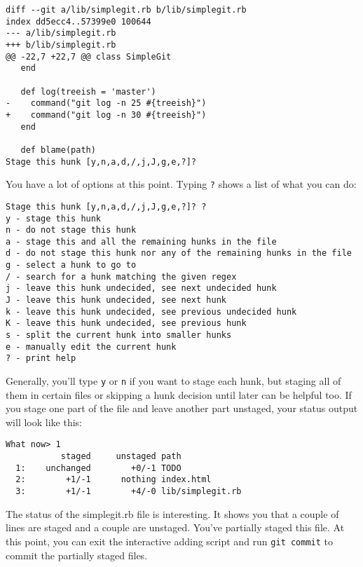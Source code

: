 \documentclass[a4paper]{book}
\begin{document}
\begin{shaded}\begin{verbatim}
diff --git a/lib/simplegit.rb b/lib/simplegit.rb
index dd5ecc4..57399e0 100644
--- a/lib/simplegit.rb
+++ b/lib/simplegit.rb
@@ -22,7 +22,7 @@ class SimpleGit
   end

   def log(treeish = 'master')
-    command("git log -n 25 #{treeish}")
+    command("git log -n 30 #{treeish}")
   end

   def blame(path)
Stage this hunk [y,n,a,d,/,j,J,g,e,?]?
\end{verbatim}\end{shaded}

You have a lot of options at this point. Typing \texttt{?} shows a list of what you can do:

\begin{shaded}\begin{verbatim}
Stage this hunk [y,n,a,d,/,j,J,g,e,?]? ?
y - stage this hunk
n - do not stage this hunk
a - stage this and all the remaining hunks in the file
d - do not stage this hunk nor any of the remaining hunks in the file
g - select a hunk to go to
/ - search for a hunk matching the given regex
j - leave this hunk undecided, see next undecided hunk
J - leave this hunk undecided, see next hunk
k - leave this hunk undecided, see previous undecided hunk
K - leave this hunk undecided, see previous hunk
s - split the current hunk into smaller hunks
e - manually edit the current hunk
? - print help
\end{verbatim}\end{shaded}

Generally, you'll type \texttt{y} or \texttt{n} if you want to stage each hunk, but staging all of them in certain files or skipping a hunk decision until later can be helpful too. If you stage one part of the file and leave another part unstaged, your status output will look like this:

\begin{shaded}\begin{verbatim}
What now> 1
           staged     unstaged path
  1:    unchanged        +0/-1 TODO
  2:        +1/-1      nothing index.html
  3:        +1/-1        +4/-0 lib/simplegit.rb
\end{verbatim}\end{shaded}

The status of the simplegit.rb file is interesting. It shows you that a couple of lines are staged and a couple are unstaged. You've partially staged this file. At this point, you can exit the interactive adding script and run \texttt{git commit} to commit the partially staged files.
\end{document}
